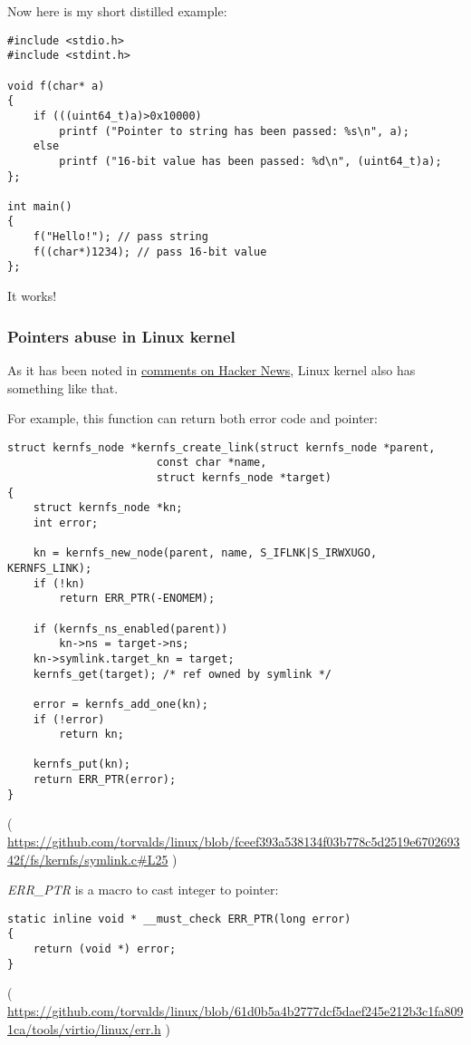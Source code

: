 Now here is my short distilled example:

\begin{lstlisting}[style=customc]
#include <stdio.h>
#include <stdint.h>

void f(char* a)
{
	if (((uint64_t)a)>0x10000)
		printf ("Pointer to string has been passed: %s\n", a);
	else
		printf ("16-bit value has been passed: %d\n", (uint64_t)a);
};

int main()
{
	f("Hello!"); // pass string
	f((char*)1234); // pass 16-bit value
};
\end{lstlisting}

It works!

\subsubsection{Pointers abuse in Linux kernel}

As it has been noted in \href{https://news.ycombinator.com/item?id=11823647}{comments on Hacker News}, Linux kernel also has something like that.

For example, this function can return both error code and pointer:

\begin{lstlisting}[style=customc]
struct kernfs_node *kernfs_create_link(struct kernfs_node *parent,
				       const char *name,
				       struct kernfs_node *target)
{
	struct kernfs_node *kn;
	int error;

	kn = kernfs_new_node(parent, name, S_IFLNK|S_IRWXUGO, KERNFS_LINK);
	if (!kn)
		return ERR_PTR(-ENOMEM);

	if (kernfs_ns_enabled(parent))
		kn->ns = target->ns;
	kn->symlink.target_kn = target;
	kernfs_get(target);	/* ref owned by symlink */

	error = kernfs_add_one(kn);
	if (!error)
		return kn;

	kernfs_put(kn);
	return ERR_PTR(error);
}
\end{lstlisting}

( \url{https://github.com/torvalds/linux/blob/fceef393a538134f03b778c5d2519e670269342f/fs/kernfs/symlink.c#L25} )

\emph{ERR\_PTR} is a macro to cast integer to pointer:

\begin{lstlisting}[style=customc]
static inline void * __must_check ERR_PTR(long error)
{
	return (void *) error;
}
\end{lstlisting}

( \url{https://github.com/torvalds/linux/blob/61d0b5a4b2777dcf5daef245e212b3c1fa8091ca/tools/virtio/linux/err.h} )


